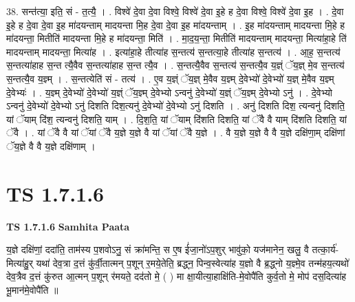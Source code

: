 \documentclass[17pt]{extarticle}
\begin{document}
38. सन्त॑त्या॒ इति॒ सं - त॒त्यै॒ । . विश्वे॑ दे॒वा दे॒वा विश्वे॒ विश्वे॑ दे॒वा इ॒हे ह दे॒वा विश्वे॒ विश्वे॑ दे॒वा इ॒ह । . दे॒वा इ॒हे ह दे॒वा दे॒वा इ॒ह मा॑दयन्ताम् मादयन्ता मि॒ह दे॒वा दे॒वा इ॒ह मा॑दयन्ताम् । . इ॒ह मा॑दयन्ताम् मादयन्ता मि॒हे ह मा॑दयन्ता॒ मितीति॑ मादयन्ता मि॒हे ह मा॑दयन्ता॒ मिति॑ । . मा॒द॒य॒न्ता॒ मितीति॑ मादयन्ताम् मादयन्ता॒ मित्या॑हा॒हे ति॑ मादयन्ताम् मादयन्ता॒ मित्या॑ह । . इत्या॑हा॒हे तीत्या॑ह स॒न्तत्य॑ स॒न्तत्या॒हे तीत्या॑ह स॒न्तत्य॑ । . आ॒ह॒ स॒न्तत्य॑ स॒न्तत्या॑हाह स॒न्त त्यै॒वैव स॒न्तत्या॑हाह स॒न्त त्यै॒व । . स॒न्तत्यै॒वैव स॒न्तत्य॑ स॒न्तत्यै॒व य॒ज्ञ्ं ॅय॒ज्ञ् मे॒व स॒न्तत्य॑ स॒न्तत्यै॒व य॒ज्ञ्म् । . स॒न्तत्येति॑ सं - तत्य॑ । . ए॒व य॒ज्ञ्ं ॅय॒ज्ञ् मे॒वैव य॒ज्ञ्म् दे॒वेभ्यो॑ दे॒वेभ्यो॑ य॒ज्ञ् मे॒वैव य॒ज्ञ्म् दे॒वेभ्यः॑ । . य॒ज्ञ्म् दे॒वेभ्यो॑ दे॒वेभ्यो॑ य॒ज्ञ्ं ॅय॒ज्ञ्म् दे॒वेभ्यो ऽन्वनु॑ दे॒वेभ्यो॑ य॒ज्ञ्ं ॅय॒ज्ञ्म् दे॒वेभ्यो ऽनु॑ । . दे॒वेभ्यो ऽन्वनु॑ दे॒वेभ्यो॑ दे॒वेभ्यो ऽनु॑ दिशति दिश॒त्यनु॑ दे॒वेभ्यो॑ दे॒वेभ्यो ऽनु॑ दिशति । . अनु॑ दिशति दिश॒ त्यन्वनु॑ दिशति॒ यां ॅयाम् दि॑श॒ त्यन्वनु॑ दिशति॒ याम् । . दि॒श॒ति॒ यां ॅयाम् दि॑शति दिशति॒ यां ॅवै वै याम् दि॑शति दिशति॒ यां ॅवै । . यां ॅवै वै यां ॅयां ॅवै य॒ज्ञे य॒ज्ञे वै यां ॅयां ॅवै य॒ज्ञे । . वै य॒ज्ञे य॒ज्ञे वै वै य॒ज्ञे दक्षि॑णा॒म् दक्षि॑णां ॅय॒ज्ञे वै वै य॒ज्ञे दक्षि॑णाम् । \newline
\pagebreak
{}

\section{ TS 1.7.1.6 }

\textbf{TS 1.7.1.6 } \newline
\textbf{Samhita Paata} \newline

य॒ज्ञे दक्षि॑णां॒ ददा॑ति॒ ताम॑स्य प॒शवोऽनु॒ सं क्रा॑मन्ति॒ स ए॒ष ई॑जा॒नो॑ऽप॒शुर् भावु॑को॒ यज॑मानेन॒ खलु॒ वै तत्का॒र्य॑-मित्या॑हु॒र् यथा॑ देव॒त्रा द॒त्तं कु॑र्वी॒तात्मन् प॒शून् र॒मये॒तेति॒ ब्रद्ध्न॒ पिन्व॒स्वेत्या॑ह य॒ज्ञो वै ब्र॒द्ध्नो य॒ज्ञ्मे॒व तन्म॑हय॒त्यथो॑ देव॒त्रैव द॒त्तं कु॑रुत आ॒त्मन् प॒शून् र॑मयते॒ दद॑तो मे॒ ( ) मा क्षा॒यीत्या॒हाक्षि॑ति-मे॒वोपै॑ति कुर्व॒तो मे॒ मोप॑ दस॒दित्या॑ह भू॒मान॑मे॒वोपै॑ति ॥ \newline
\end{document}
